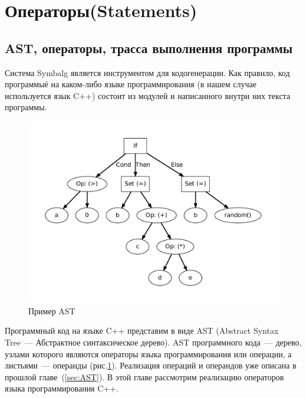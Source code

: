 \section{Операторы(Statements)} 
\subsection{AST, операторы, трасса выполнения программы}
Система {\sf Symbalg} является инструментом для кодогенерации. Как правило, код программыё на каком-либо языке программирования (в нашем случае используется язык {\sf C++}) состоит из модулей и написанного внутри них текста программы. 

\begin{center}
    \begin{figure}
        \includegraphics[width=\textwidth]{images/If.pdf}
        \caption{Пример AST}
        \label{fig:ast}
    \end{figure}
\end{center}

Программный код на языке {\sf C++} представим в виде AST (Abstract Syntax Tree~--- Абстрактное синтаксическое дерево).
AST программного кода~--- дерево, узлами которого являются операторы языка программирования или операции, а листьями~--- операнды (рис.\ref{fig:ast}). Реализация операций и операндов уже описана в прошлой главе~(\ref{sec:AST}). В этой главе рассмотрим реализацию операторов языка программирования {\sf C++}.

